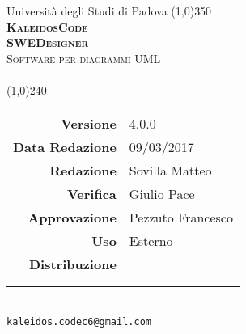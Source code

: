 \documentclass[a4paper,12pt]{article}
\author{KaleidosCode}
\date{09/03/2017}	%
\begin{document}
	\begin{titlepage}
		\centering Università degli Studi di Padova
		\line(1,0){350}\\
		\vspace{0.4cm}
		{\bfseries\scshape\LARGE KaleidosCode\\}
		\vspace{0.4cm}
		{\bfseries\scshape\LARGE SWEDesigner\\}
		{\scshape\Large Software per diagrammi UML\\}
		\vspace{1cm}
		{\scshape\Large \pianodiqualificai\ \\}		%
		\vspace{1.4cm}
		\logo
		\vspace{1.2cm}
		\line(1,0){240}\\
		\begin{tabular}{r|l}
			{\hfill \textbf{Versione}} 			& 4.0.0\\
			{\hfill \textbf{Data Redazione}} 	& 09/03/2017\\	%
			{\hfill \textbf{Redazione}} 		& Sovilla Matteo\\	%
			{\hfill \textbf{Verifica}} 			& Giulio Pace\\	%
			{\hfill \textbf{Approvazione}} 		& Pezzuto Francesco\\	%
			{\hfill \textbf{Uso}} 				& Esterno\\
			{\hfill \textbf{Distribuzione}} 	& \vardanega \\ & \cardin \\ & \proponente\\
		\end{tabular}\\
		\vspace{2cm}
		\texttt{kaleidos.codec6@gmail.com}
	\end{titlepage}
	
	\pagestyle{myfront} 
	\newpage
	
	\newpage
	\tableofcontents
	\newpage
	\listoftables
	\newpage
	\listoffigures
	\newpage
	\pagestyle{mymain}
	
	\newpage
	
	\newpage
	
	\newpage
	
	\appendix
	\newpage
	
	\newpage
	
	
	\label{LastPage}
\end{document}
